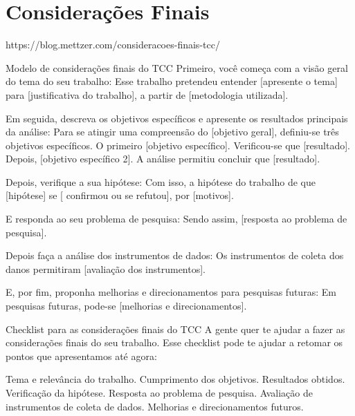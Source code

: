 \chapter{Considerações Finais}
\label{chap:Resultados Finais} 
https://blog.mettzer.com/consideracoes-finais-tcc/

Modelo de considerações finais do TCC
Primeiro, você começa com a visão geral do tema do seu trabalho:
Esse trabalho pretendeu entender [apresente o tema] para [justificativa do trabalho], a partir de [metodologia utilizada].

Em seguida, descreva os objetivos específicos e apresente os resultados principais da análise:
Para se atingir uma compreensão do [objetivo geral], definiu-se três objetivos específicos. O primeiro [objetivo específico]. Verificou-se que [resultado]. Depois, [objetivo específico 2]. A análise permitiu concluir que [resultado].

Depois, verifique a sua hipótese:
Com isso, a hipótese do trabalho de que [hipótese] se [ confirmou ou se refutou], por [motivos].

E responda ao seu problema de pesquisa:
Sendo assim, [resposta ao problema de pesquisa].

Depois faça a análise dos instrumentos de dados:
Os instrumentos de coleta dos danos permitiram [avaliação dos instrumentos].

E, por fim, proponha melhorias e direcionamentos para pesquisas futuras:
Em pesquisas futuras, pode-se [melhorias e direcionamentos].

Checklist para as considerações finais do TCC
A gente quer te ajudar a fazer as considerações finais do seu trabalho. Esse checklist pode te ajudar a retomar os pontos que apresentamos até agora:

Tema e relevância do trabalho.
Cumprimento dos objetivos.
Resultados obtidos.
Verificação da hipótese.
Resposta ao problema de pesquisa.
Avaliação de instrumentos de coleta de dados. 
Melhorias e direcionamentos futuros. 